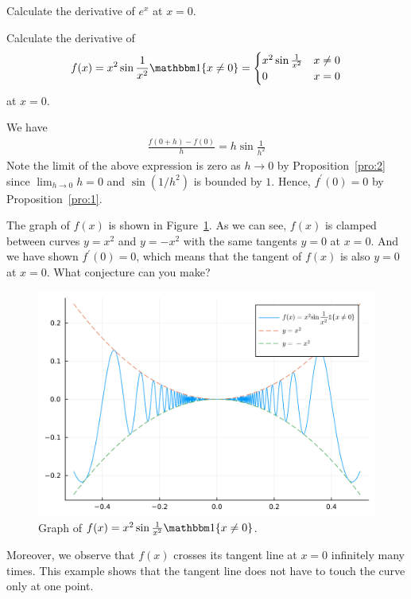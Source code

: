 \documentclass[thmcnt=section, 12pt]{my-elegantbook}
\begin{document}
\begin{exercise}
    Calculate the derivative of $e^x$ at $x = 0$. 

    \noindent [Hint: You may use the fact $e^x = \sum_{n=0}^\infty \frac{x^n}{n!} =  1 + x + \frac{1}{2} x^2 + \frac{1}{6} x^3 + \cdots$.]
\end{exercise}

\begin{exercise}
    Calculate the derivative of
    \begin{align*}
        f(x) 
        = x^2 \sin \frac{1}{x^2} \ind\{x \neq 0\}
        = \begin{cases}
            x^2 \sin \frac{1}{x^2} &x \neq 0 \\ 
            0 &x=0
        \end{cases}
    \end{align*}
    at $x = 0$.
    \label{ex:1}
\end{exercise}

\begin{solution}
    We have 
    \begin{align*}
        \frac{f(0+h) - f(0)}{h}
        = h \sin \frac{1}{h^2}
    \end{align*}
    Note the limit of the above expression is zero as $h \to 0$ by Proposition~\ref{pro:2} since $\lim_{h\to 0} h = 0$ and $\sin (1/h^2)$ is bounded by $1$. Hence, $f^\prime(0) = 0$ by Proposition~\ref{pro:1}.

    The graph of $f(x)$ is shown in Figure~\ref{fig:2}. As we can see, $f(x)$ is clamped between curves $y=x^2$ and $y=-x^2$ with the same tangents $y=0$ at $x=0$. And we have shown $f^\prime(0)=0$, which means that the tangent of $f(x)$ is also $y=0$ at $x=0$. What conjecture can you make?

    \begin{figure}[ht]
        \centering
        \includegraphics[scale=0.2]{figures/graph-001.png}
        \caption{Graph of $f(x) = x^2 \sin \frac{1}{x^2} \ind\{x \neq 0\}$.}
        \label{fig:2}
    \end{figure}

    Moreover, we observe that $f(x)$ crosses its tangent line at $x=0$ infinitely many times. This example shows that the tangent line does not have to touch the curve only at one point.
\end{solution}
\end{document}
